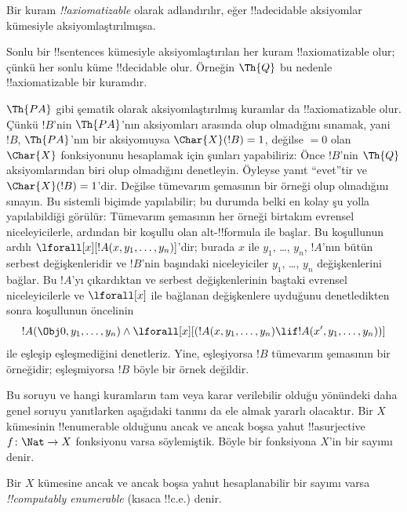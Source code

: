 \documentclass[../../../include/open-logic-section]{subfiles}
\begin{document}
\begin{defn}
Bir kuram \emph{!!{axiomatizable}} olarak adlandırılır, eğer
!!a{decidable} aksiyomlar kümesiyle aksiyomlaştırılmışsa.
\end{defn}

\begin{ex}
Sonlu bir !!{sentence}s kümesiyle aksiyomlaştırılan her kuram
!!{axiomatizable} olur; çünkü her sonlu küme !!{decidable} olur. Örneğin
$\Th{Q}$ bu nedenle !!{axiomatizable} bir kuramdır.

$\Th{PA}$ gibi şematik olarak aksiyomlaştırılmış kuramlar da
!!{axiomatizable} olur. Çünkü $!B$'nin $\Th{PA}$'nın aksiyomları arasında
olup olmadığını sınamak, yani $!B$, $\Th{PA}$'nın bir aksiyomuysa
$\Char{X}(!B)=1$, değilse $=0$ olan $\Char{X}$ fonksiyonunu hesaplamak için
şunları yapabiliriz: Önce $!B$'nin $\Th{Q}$ aksiyomlarından biri olup
olmadığını denetleyin. Öyleyse yanıt ``evet''tir ve
$\Char{X}(!B)=1$'dir. Değilse tümevarım şemasının bir örneği olup olmadığını
sınayın. Bu sistemli biçimde yapılabilir; bu durumda belki en kolay şu yolla
yapılabildiği görülür: Tümevarım şemasının her örneği birtakım evrensel
niceleyicilerle, ardından bir koşullu olan alt-!!{formula} ile başlar.
Bu koşullunun ardılı $\lforall[x][!A(x, y_1, \dots, y_n)]$'dir; burada
$x$ ile $y_1$, \dots, $y_n$, $!A$'nın bütün serbest değişkenleridir ve
$!B$'nin başındaki niceleyiciler $y_1$, \dots, $y_n$ değişkenlerini bağlar.
Bu $!A$'yı çıkardıktan ve serbest değişkenlerinin baştaki evrensel
niceleyicilerle ve $\lforall[x]$ ile bağlanan değişkenlere uyduğunu
denetledikten sonra koşullunun öncelinin
\[
!A(\Obj 0, y_1, \dots, y_n) \land \lforall[x][(!A(x, y_1, \dots, y_n)
\lif !A(x', y_1, \dots, y_n))]
\]
ile eşleşip eşleşmediğini denetleriz. Yine, eşleşiyorsa $!B$ tümevarım
şemasının bir örneğidir; eşleşmiyorsa $!B$ böyle bir örnek değildir.
\end{ex}

Bu soruyu ve hangi kuramların tam veya karar verilebilir olduğu yönündeki
daha genel soruyu yanıtlarken aşağıdaki tanımı da ele almak yararlı
olacaktır. Bir $X$ kümesinin !!{enumerable} olduğunu ancak ve ancak boşsa
yahut !!a{surjective} $f \colon \Nat \to X$ fonksiyonu varsa söylemiştik.
Böyle bir fonksiyona $X$'in bir sayımı denir.

\begin{defn}
Bir $X$ kümesine ancak ve ancak boşsa yahut hesaplanabilir bir sayımı varsa
\emph{!!{computably enumerable}} (kısaca !!{c.e.}) denir.
\end{defn}
\end{document}
